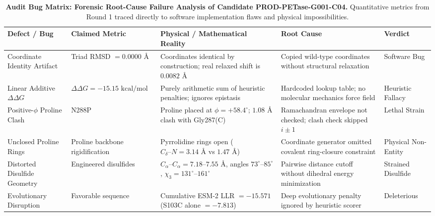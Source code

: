 \documentclass[11pt,a4paper]{article}
\begin{document}
\begin{table}[H]
\centering
\small
\caption{\textbf{Audit Bug Matrix: Forensic Root-Cause Failure Analysis of Candidate PROD-PETase-G001-C04.} Quantitative metrics from Round 1 traced directly to software implementation flaws and physical impossibilities.}
\label{tab:audit_bugs}
\begin{tabularx}{\textwidth}{lXXll}
\toprule
\textbf{Defect / Bug} & \textbf{Claimed Metric} & \textbf{Physical / Mathematical Reality} & \textbf{Root Cause} & \textbf{Verdict} \\
\midrule
Coordinate Identity Artifact & Triad RMSD $= 0.0000\text{ \AA}$ & Coordinates identical by construction; real relaxed shift is $0.0082\text{ \AA}$ & Copied wild-type coordinates without structural relaxation & Software Bug \\
Linear Additive $\Delta\Delta G$ & $\Delta\Delta G = -15.15\text{ kcal/mol}$ & Purely arithmetic sum of heuristic penalties; ignores epistasis & Hardcoded lookup table; no molecular mechanics force field & Heuristic Fallacy \\
Positive-$\phi$ Proline Clash & N288P & Proline placed at $\phi = +58.4^\circ$; $1.08\text{ \AA}$ clash with Gly287(C) & Ramachandran envelope not checked; clash check skipped $i \pm 1$ & Lethal Strain \\
Unclosed Proline Rings & Proline backbone rigidification & Pyrrolidine rings open ($C_\delta\text{--}N = 3.14\text{ \AA}$ vs $1.47\text{ \AA}$) & Coordinate generator omitted covalent ring-closure constraint & Physical Non-Entity \\
Distorted Disulfide Geometry & Engineered disulfides & $C_\alpha\text{--}C_\alpha = 7.18\text{--}7.55\text{ \AA}$, angles $73^\circ\text{--}85^\circ$, $\chi_3 = 131^\circ\text{--}161^\circ$ & Pairwise distance cutoff without dihedral energy minimization & Strained Disulfide \\
Evolutionary Disruption & Favorable sequence & Cumulative ESM-2 LLR $= -15.571$ (S103C alone $= -7.813$) & Deep evolutionary penalty ignored by heuristic scorer & Deleterious \\
\bottomrule
\end{tabularx}
\end{table}
\end{document}
